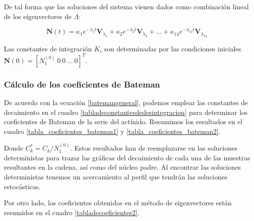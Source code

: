 De tal forma que las soluciones del sistema vienen dados como combinación lineal de los eigenvectores de $\Lambda$:

$$\mathbf{N}(t)=\kappa_1 e^{-\lambda_1 t} \mathbf{V}_{\lambda_1}+\kappa_2 e^{-\lambda_2 t} \mathbf{V}_{\lambda_2}+...+\kappa_{14} e^{-\lambda_{14} t} \mathbf{V}_{\lambda_{14}}$$

\noindent Las constantes de integración $K_i$ son determinadas por las condiciones iniciales $\mathbf{N}(0)=\left[N_1^{(0)}\ 0\ 0\ ...\ 0\right]^T$.

\subsubsection{Cálculo de los coeficientes de Bateman}

De acuerdo con la ecuación \ref{batemangeneral}, podemos emplear las constantes de decaimiento en el cuadro \ref{tabladeconstantesdedesintegracion} para determinar los coeficientes de Bateman de la serie del actínido. Resumimos los resultados en el cuadro \ref{tabla_coeficientes_bateman1} y \ref{tabla_coeficientes_bateman2}. 

Donde $C_k^*=C_k/N_1^{(0)}$. Estos resultados han de reemplazarse en las soluciones deterministas para trazar las gráficas del decaimiento de cada una de las muestras resultantes en la cadena, así como del núcleo padre. Al encontrar las soluciones deterministas tenemos un acercamiento al perfil que tendrán las soluciones estocásticas. 

Por otro lado, los coeficientes obtenidos en el método de eigenvectores están resumidos en el cuadro \ref{tabladecoeficientes2}. 

